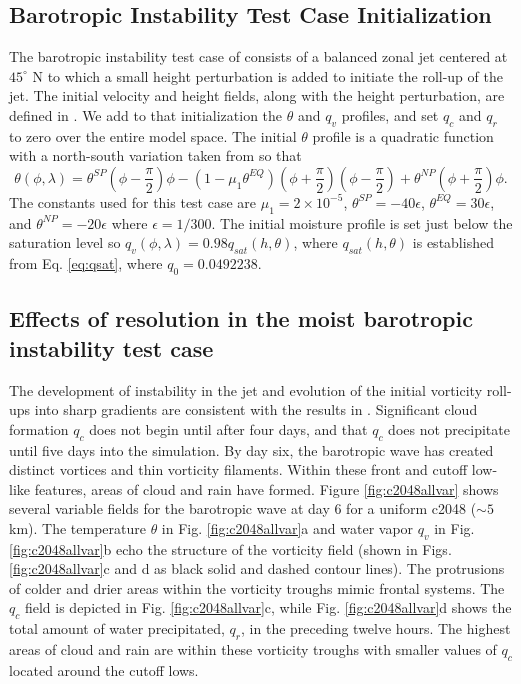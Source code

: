 \subsection{Barotropic Instability Test Case Initialization}
The barotropic instability test case of \cite{galewsky2004initial} 
consists of a balanced zonal jet centered at $45^\circ$ N to 
which a small height perturbation is added to initiate the roll-up
of the jet. The initial velocity and height fields, along with the height
perturbation, are defined in \cite{galewsky2004initial}.
We add to that initialization the
$\theta$ and $q_v$ profiles, and set $q_c$ and $q_r$ to zero over the entire model space.  
The initial $\theta$ profile is a quadratic function with a north-south variation
     taken from \cite{zerroukat2015moist} so that
   \begin{equation}
     \label{eq:pottemp}
     \theta(\phi, \lambda) = \theta^{SP}\left(\phi - \frac{\pi}{2}\right)\phi - 
     \left(1 - \mu_1 \theta^{EQ}\right)\left(\phi + \frac{\pi}{2}\right)\left(\phi - \frac{\pi}{2}\right)
     + \theta^{NP}\left(\phi + \frac{\pi}{2}\right)\phi.
   \end{equation}
The constants used for this test case are $\mu_1 = 2\times 10^{-5} $, 
$\theta^{SP}= -40\epsilon$, $\theta^{EQ}= 30\epsilon$,
and $\theta^{NP}= -20\epsilon$ where $\epsilon = 1 / 300$. The initial moisture profile 
is set just below the saturation level so $q_v(\phi, \lambda) = 0.98 q_{sat}(h, \theta)$, 
where $q_{sat}(h, \theta)$ is established from Eq. \ref{eq:qsat}, where $q_0 = 0.0492238$. 

\subsection{Effects of resolution in the moist barotropic instability test case}
The development of instability in the jet and evolution of the initial vorticity
roll-ups into sharp gradients are consistent with the results in \cite{galewsky2004initial}.
Significant cloud formation $q_c$ does not begin until after four days, and that $q_c$ 
does not precipitate until five days into the simulation. By day six, the barotropic
wave has created distinct vortices and thin vorticity filaments. Within these front and
cutoff low-like features, areas of cloud and rain have formed. Figure \ref{fig:c2048allvar}
shows several variable fields for the barotropic wave at day 6 for
a uniform c2048 ($\sim 5$ km). The 
temperature $\theta$ in Fig. \ref{fig:c2048allvar}a and water vapor $q_v$ in
Fig. \ref{fig:c2048allvar}b echo the structure of the vorticity field 
(shown in Figs. \ref{fig:c2048allvar}c and d as black solid and dashed contour lines).
The protrusions of colder and drier areas within the vorticity troughs mimic frontal
systems. The $q_c$ field is depicted in Fig. \ref{fig:c2048allvar}c, while
Fig. \ref{fig:c2048allvar}d shows the total amount of water precipitated, $q_r$, 
in the preceding twelve hours. The highest areas of cloud and rain are 
within these vorticity troughs with smaller values of $q_c$ located around
the cutoff lows.

